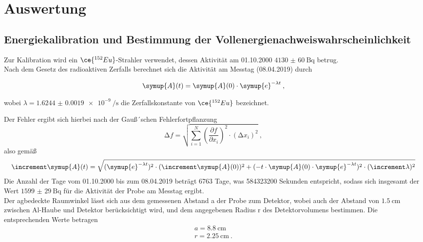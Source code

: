 \section{Auswertung}
\label{sec:Auswertung}
\subsection{Energiekalibration und Bestimmung der Vollenergienachweiswahrscheinlichkeit}
Zur Kalibration wird ein $\ce{^{152}Eu}$-Strahler verwendet, dessen Aktivität am 01.10.2000
$\SI{4130(60)}{\becquerel} $ betrug. \\
Nach dem Gesetz des radioaktiven Zerfalls berechnet sich die Aktivität am Messtag (08.04.2019) durch

\begin{equation}
  \symup{A} (t) = \symup{A}(0)\cdot \symup{e}^{-\lambda t} \: ,
\end{equation}

wobei $\lambda=\SI{1.6244(19)e-9}{\per\second}$ \cite{lara} die Zerfallskonstante
von $\ce{^{152}Eu}$ bezeichnet.

Der Fehler ergibt sich hierbei nach der Gauß´schen Fehlerfortpflanzung
\begin{equation}
  \increment f = \sqrt{ \sum_{i=1}^N \left( \frac{\partial f}{\partial x_i}\right)^2
  \cdot (\increment x_i)^2  } \: ,
  \label{eqn:gaus}
\end{equation}
also gemäß
\begin{equation}
  \increment \symup{A} (t) = \sqrt{ (\symup{e}^{-\lambda t})^{2}\cdot (\increment \symup{A}(0))^2
   + (-t\cdot\symup{A}(0)\cdot \symup{e}^{-\lambda t})^2\cdot(\increment \lambda)^2}
\end{equation}
Die Anzahl der Tage vom 01.10.2000 bis zum 08.04.2019 beträgt 6763 Tage, was
584323200 Sekunden entspricht, sodass sich insgesamt der Wert $\SI{1599(29)}{\becquerel} $
für die Aktivität der Probe am Messtag ergibt. \\
Der agbedeckte Raumwinkel lässt sich aus dem gemessenen Abstand a der Probe
zum Detektor, wobei auch der Abstand von $\SI{1.5}{\centi\meter}$ zwischen Al-Haube und Detektor
berücksichtigt wird,
und dem angegebenen Radius r des Detektorvolumens bestimmen. Die entsprechenden Werte
betragen
\begin{align*}
  a = \SI{8.8}{\centi\meter} \\
  r = \SI{2.25}{\centi\meter} \: .
\end{align*}

